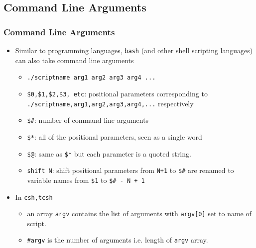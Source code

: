 \documentclass[10pt,t]{beamer}
\begin{document}
\subsection{Command Line Arguments}
\begin{frame}
  \frametitle{Command Line Arguments}
  \begin{itemize}
    \item Similar to programming languages, \texttt{bash} (and other shell scripting languages) can also take command line arguments
    \begin{itemize}
      \item \texttt{./scriptname arg1 arg2 arg3 arg4 ...}
      \item \texttt{\$0,\$1,\$2,\$3, etc}: positional parameters corresponding to \texttt{./scriptname,arg1,arg2,arg3,arg4,...} respectively  
      \item \texttt{\$\#}: number of command line arguments
      \item \texttt{\$*}: all of the positional parameters, seen as a single word
      \item \texttt{\$@}: same as \texttt{\$*} but each parameter is a quoted string.
      \item \texttt{shift N}: shift positional parameters from \texttt{N+1} to \texttt{\$\#} are renamed to variable names from \texttt{\$1} to \texttt{\$\# - N + 1}
    \end{itemize}
    \item In \texttt{csh,tcsh}
    \begin{itemize}
      \item an array \texttt{argv} contains the list of arguments with \texttt{argv[0]} set to name of script.
      \item \texttt{\#argv} is the number of arguments i.e. length of \texttt{argv} array.
    \end{itemize}
  \end{itemize}
\end{frame}
\end{document}

